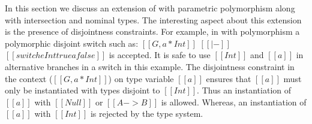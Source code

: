 



In this section we discuss an extension of \name with parametric polymorphism
along with intersection and nominal types. The interesting aspect about this
extension is the presence of disjointness constraints.
For example, in \name with polymorphism a polymorphic disjoint switch such as:
$[[G, a * Int]]$ $[[|-]]$ $[[switch e Int true a false]]$ is accepted. It is safe to use
$[[Int]]$ and $[[a]]$ in alternative branches in a switch in this example.
The disjointness constraint in the context ($[[G, a * Int]]$) on type variable $[[a]]$
ensures that $[[a]]$ must only be instantiated with types disjoint
to $[[Int]]$. Thus an instantiation of $[[a]]$ with $[[Null]]$  or $[[A -> B]]$
is allowed. Whereas, an instantiation of $[[a]]$ with $[[Int]]$ is rejected by the type system.


